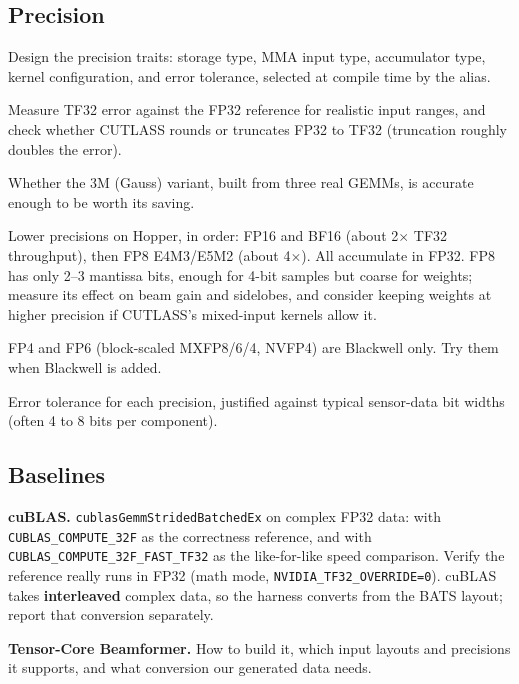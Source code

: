 \documentclass[10pt,letterpaper]{article}
\begin{document}
\subsection*{Precision}
\begin{todo}
  \item Design the precision traits: storage type, MMA input type, accumulator type, kernel configuration, and error tolerance, selected at compile time by the alias.
  \item Measure TF32 error against the FP32 reference for realistic input ranges, and check whether CUTLASS rounds or truncates FP32 to TF32 (truncation roughly doubles the error).
  \item Whether the 3M (Gauss) variant, built from three real GEMMs, is accurate enough to be worth its saving.
  \item Lower precisions on Hopper, in order: FP16 and BF16 (about 2$\times$ TF32 throughput), then FP8 E4M3/E5M2 (about 4$\times$). All accumulate in FP32. FP8 has only 2--3 mantissa bits, enough for 4-bit samples but coarse for weights; measure its effect on beam gain and sidelobes, and consider keeping weights at higher precision if CUTLASS's mixed-input kernels allow it.
  \item FP4 and FP6 (block-scaled MXFP8/6/4, NVFP4) are Blackwell only. Try them when Blackwell is added.
  \item Error tolerance for each precision, justified against typical sensor-data bit widths (often 4 to 8 bits per component).
\end{todo}

\subsection*{Baselines}
\begin{todo}
  \item \textbf{cuBLAS.} \texttt{cublasGemmStridedBatchedEx} on complex FP32 data: with \texttt{CUBLAS\_COMPUTE\_32F} as the correctness reference, and with \texttt{CUBLAS\_COMPUTE\_32F\_FAST\_TF32} as the like-for-like speed comparison. Verify the reference really runs in FP32 (math mode, \texttt{NVIDIA\_TF32\_OVERRIDE=0}). cuBLAS takes \textbf{interleaved} complex data, so the harness converts from the BATS layout; report that conversion separately.
  \item \textbf{Tensor-Core Beamformer.} How to build it, which input layouts and precisions it supports, and what conversion our generated data needs.
\end{todo}
\end{document}
